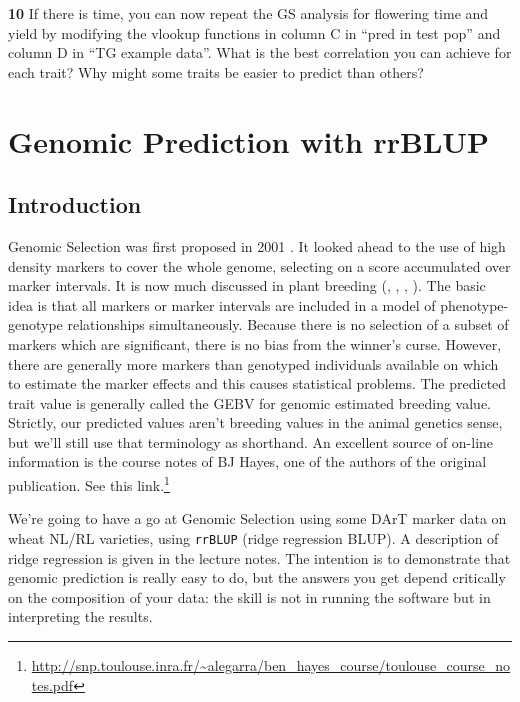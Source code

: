 \documentclass[
]{book}
\makeatletter
\renewcommand{\href}[2]{#2\footnote{\url{#1}}}
\newenvironment{kframe}{%
\medskip{}
\setlength{\fboxsep}{.8em}
 \def\at@end@of@kframe{}%
 \ifinner\ifhmode%
  \def\at@end@of@kframe{\end{minipage}}%
  \begin{minipage}{\columnwidth}%
 \fi\fi%
 \def\FrameCommand##1{\hskip\@totalleftmargin \hskip-\fboxsep
 \colorbox{shadecolor}{##1}\hskip-\fboxsep
     \hskip-\linewidth \hskip-\@totalleftmargin \hskip\columnwidth}%
 \MakeFramed {\advance\hsize-\width
   \@totalleftmargin\z@ \linewidth\hsize
   \@setminipage}}%
 {\par\unskip\endMakeFramed%
 \at@end@of@kframe}
\newenvironment{rmdblock}[1]
  {
  \begin{itemize}
  \renewcommand{\labelitemi}{
    \raisebox{-.7\height}[0pt][0pt]{
      {\setkeys{Gin}{width=3em,keepaspectratio}\texttt{[image: images/\#1]}}
    }
  }
  \setlength{\fboxsep}{1em}
  \begin{kframe}
  \item
  }
  {
  \end{kframe}
  \end{itemize}
  }
\newenvironment{rmdquiz}
  {\begin{rmdblock}{quiz}}
  {\end{rmdblock}}
\makeatother
\begin{document}
\begin{rmdquiz}
\textbf{10}
If there is time, you can now repeat the GS analysis for flowering time and yield by modifying the vlookup functions in column C in ``pred in test pop'' and column D in ``TG example data''. What is the best correlation you can achieve for each trait? Why might some traits be easier to predict than others?
\end{rmdquiz}

\hypertarget{genomic-prediction-with-rrblup}{%
\section{Genomic Prediction with rrBLUP}\label{genomic-prediction-with-rrblup}}

\hypertarget{introduction-5}{%
\subsection{Introduction}\label{introduction-5}}

Genomic Selection was first proposed in 2001 \citep{Meuwissen1819}. It looked ahead to the use of high density markers to cover the whole genome, selecting on a score accumulated over marker intervals. It is now much discussed in plant breeding (\citet{Bernardo2007}, \citet{Heffner2009},
\citet{Piepho2009}, \citet{Jannink2010}). The basic idea is that all markers or marker intervals are included in a model of phenotype-genotype relationships simultaneously. Because there is no selection of a subset of markers which are significant, there is no bias from the winner's curse. However, there are generally more markers than genotyped individuals available on which to estimate the marker effects and this causes statistical problems. The predicted
trait value is generally called the GEBV for genomic estimated breeding value. Strictly, our
predicted values aren't breeding values in the animal genetics sense, but we'll still use that terminology as shorthand. An excellent source of on-line information is the course notes of BJ Hayes, one of the authors of the original publication. \href{http://snp.toulouse.inra.fr/~alegarra/ben_hayes_course/toulouse_course_notes.pdf}{See this link.}

We're going to have a go at Genomic Selection using some DArT marker data on wheat
NL/RL varieties, using \texttt{rrBLUP} (ridge regression BLUP). A description of ridge regression is
given in the lecture notes. The intention is to demonstrate that genomic prediction is really
easy to do, but the answers you get depend critically on the composition of your data: the
skill is not in running the software but in interpreting the results.
\end{document}
